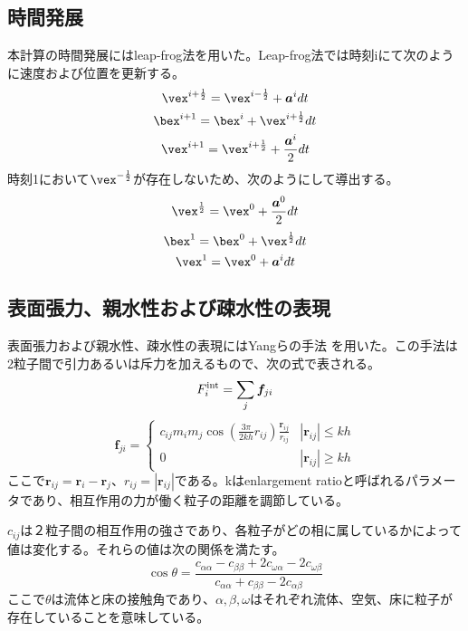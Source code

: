 \documentclass[]{jsarticle}
\begin{document}
\subsection{時間発展}
本計算の時間発展にはleap-frog法を用いた。Leap-frog法では時刻iにて次のように速度および位置を更新する。
\begin{equation}
  \vex^{i+\frac{1}{2}}=\vex^{i-\frac{1}{2}}+\bm{a}^idt
\end{equation}
\begin{equation}
  \bex^{i+1}=\bex^i+\vex^{i+\frac{1}{2}}dt
\end{equation}
\begin{equation}
  \vex^{i+1}=\vex^{i+\frac{1}{2}}+\frac{\bm{a}^i}{2}dt
\end{equation}
時刻1において$\vex^{-\frac{1}{2}}$が存在しないため、次のようにして導出する。
\begin{equation}
  \vex^{\frac{1}{2}}=\vex^{0}+\frac{\bm{a}^0}{2}dt
\end{equation}
\begin{equation}
  \bex^{1}=\bex^0+\vex^{\frac{1}{2}}dt
\end{equation}
\begin{equation}
  \vex^{1}=\vex^{0}+\bm{a}^idt
\end{equation}


\subsection{表面張力、親水性および疎水性の表現}
表面張力および親水性、疎水性の表現にはYangらの手法 \cite{Yang}を用いた。この手法は2粒子間で引力あるいは斥力を加えるもので、次の式で表される。
\begin{equation}
F^{\rm{int}}_i=\sum_{j} \bm{f}_{ji}
\end{equation}
\begin{equation}
  \bm{f}_{ji}=\begin{cases}
    c_{ij}m_im_j\cos(\frac{3\pi}{2kh}r_{ij})\frac{\bm{r}_{ij}}{r_{ij}} & \text{$|\bm{r}_{ij}|\leq kh$}\\
    0 & \text{$|\bm{r}_{ij}|\geq kh$}
\end{cases}
\end{equation}
ここで$\bm{r}_{ij}=\bm{r}_i-\bm{r}_{j}$、$r_{ij}=|\bm{r}_{ij}|$である。kはenlargement ratioと呼ばれるパラメータであり、相互作用の力が働く粒子の距離を調節している。

$c_{ij}$は２粒子間の相互作用の強さであり、各粒子がどの相に属しているかによって値は変化する。それらの値は次の関係を満たす。
\begin{equation}
\cos\theta=\frac{c_{\alpha\alpha}-c_{\beta\beta}+2c_{\omega\alpha}-2c_{\omega\beta}}{c_{\alpha\alpha} +c_{\beta\beta} -2c_{\alpha\beta}}
\end{equation}
ここで$\theta$は流体と床の接触角であり、$\alpha,\beta,\omega$はそれぞれ流体、空気、床に粒子が存在していることを意味している。
\end{document}
